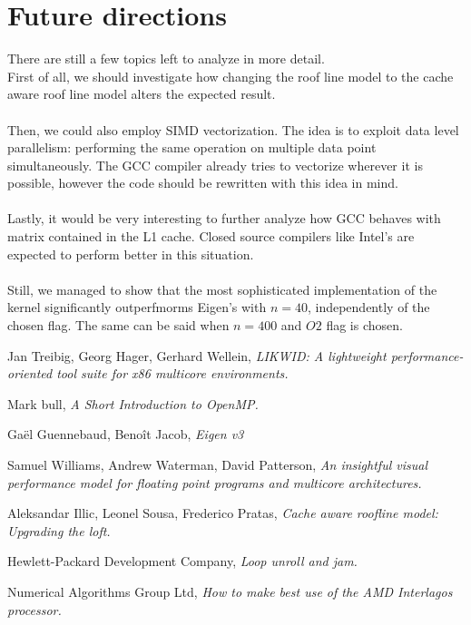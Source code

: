 \documentclass[11pt,a4paper,oneside,titlepage,openright]{book}
\begin{document}
\chapter{Future directions}
There are still a few topics left to analyze in more detail. \\
First of all, we should investigate how changing the roof line model to the cache aware roof line model alters the expected result. \\\\
Then, we could also employ SIMD vectorization. The idea is to exploit data level parallelism: performing the same operation on multiple data point simultaneously. The GCC compiler already tries to vectorize wherever it is possible, however the code should be rewritten with this idea in mind. \\\\
Lastly, it would be very interesting to further analyze how GCC behaves with matrix contained in the L1 cache.
Closed source compilers like Intel's are expected to perform better in this situation. \\\\
Still, we managed to show that the most sophisticated implementation of the kernel significantly outperfmorms Eigen's with $n = 40$, independently of the chosen flag. The same can be said when $n = 400$ and $O2$ flag is chosen.

\begin{thebibliography}{1}

Jan Treibig, Georg Hager, Gerhard Wellein, \textit{LIKWID: A lightweight performance-oriented tool suite for x86 multicore environments.}
 
Mark bull, \textit{A Short Introduction to OpenMP.}

Ga\"{e}l Guennebaud, Beno\^{i}t Jacob, \textit{Eigen v3}

Samuel Williams, Andrew Waterman, David Patterson, \textit{An insightful visual performance model for floating point programs and multicore architectures.}

Aleksandar Illic, Leonel Sousa, Frederico Pratas, \textit{Cache aware roofline model: Upgrading the loft.}

Hewlett-Packard Development Company, \textit{Loop unroll and jam.}

Numerical Algorithms Group Ltd, \textit{How to make best use of the AMD Interlagos processor.}
\end{thebibliography}
 
\end{document}
